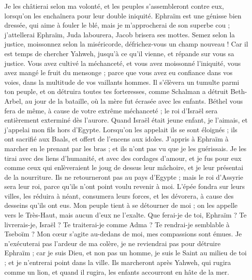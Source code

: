 \begin{multicols}{2}
Je les châtierai selon ma volonté, et les peuples s'assembleront contre eux, lorsqu'on les enchaînera pour leur double iniquité.
Ephraïm est une génisse bien dressée, qui aime à fouler le blé, mais je m'approcherai de son superbe cou ; j'attellerai Ephraïm, Juda labourera, Jacob brisera ses mottes.
Semez selon la justice, moissonnez selon la miséricorde, défrichez-vous un champ nouveau ! Car il est temps de chercher Yahweh, jusqu'à ce qu'il vienne, et répande sur vous sa justice.
Vous avez cultivé la méchanceté, et vous avez moissonné l'iniquité, vous avez mangé le fruit du mensonge ; parce que vous avez eu confiance dans vos voies, dans la multitude de vos vaillants hommes.
Il s'élèvera un tumulte parmi ton peuple, et on détruira toutes tes forteresses, comme Schalman a détruit Beth-Arbel, au jour de la bataille, où la mère fut écrasée avec les enfants.
Béthel vous fera de même, à cause de votre extrême méchanceté ; le roi d'Israël sera entièrement exterminé dès l'aurore.
\VerseOne{}Quand Israël était jeune enfant, je l'aimais, et j'appelai mon fils hors d'Egypte.
Lorsqu'on les appelait ils se sont éloignés ; ils ont sacrifié aux Baals, et offert de l'encens aux idoles.
J'appris à Ephraïm à marcher en le prenant par les bras ; et ils n'ont pas vu que je les guérissais.
Je les tirai avec des liens d'humanité, et avec des cordages d'amour, et je fus pour eux comme ceux qui enlèveraient le joug de dessus leur mâchoire, et je leur présentai de la nourriture.
Ils ne retourneront pas au pays d'Egypte ; mais le roi d'Assyrie sera leur roi, parce qu'ils n'ont point voulu revenir à moi.
L'épée fondra sur leurs villes, les réduira à néant, consumera leurs forces, et les dévorera, à cause des desseins qu'ils ont eus.
Mon peuple tient à se détourner de moi ; on les appelle vers le Très-Haut, mais aucun d'eux ne l'exalte.
Que ferai-je de toi, Ephraïm ? Te livrerais-je, Israël ? Te traiterai-je comme Adma ? Te rendrai-je semblable à Tseboïm ? Mon cœur s'agite au-dedans de moi, mes compassions sont émues.
Je n'exécuterai pas l'ardeur de ma colère, je ne reviendrai pas pour détruire Ephraïm ; car je suis Dieu, et non pas un homme, je suis le Saint au milieu de toi ; et je n'entrerai point dans la ville.
Ils marcheront après Yahweh, qui rugira comme un lion, et quand il rugira, les enfants accourront en hâte de la mer.

\end{multicols}
